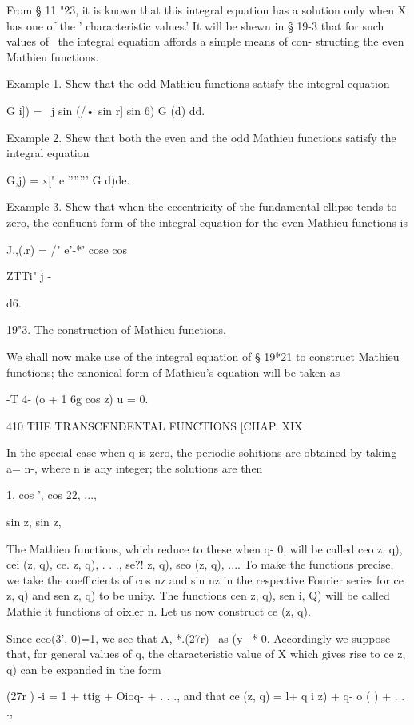 From § 11 "23, it is known that this integral equation has a solution
only when X has one of the ' characteristic values.' It will be shewn
in § 19-3 that for such values of \, the integral equation affords a
simple means of con- structing the even Mathieu functions.

Example 1. Shew that the odd Mathieu functions satisfy the integral
equation

G i]) = \ j sin (/• sin r] sin 6) G (d) dd.

Example 2. Shew that both the even and the odd Mathieu functions
satisfy the integral equation

G,j) = x[" e ''''''' G d)de.

Example 3. Shew that when the eccentricity of the fundamental ellipse
tends to zero, the confluent form of the integral equation for the
even Mathieu functions is

J,,(.r) = /" e'-*' cose cos

ZTTi" j -

d6.

19"3. The construction of Mathieu functions.

We shall now make use of the integral equation of § 19*21 to construct
Mathieu functions; the canonical form of Mathieu's equation will be
taken as

-T 4- (o + 1 6g cos z) u = 0.

410 THE TRANSCENDENTAL FUNCTIONS [CHAP. XIX

In the special case when q is zero, the periodic sohitions are
obtained by taking a= n-, where n is any integer; the solutions are
then

1, cos ', cos 22, ...,

sin z, sin z,

The Mathieu functions, which reduce to these when q- 0, will be called
ceo z, q), cei (z, q), ce. z, q), . . ., se?! z, q), seo (z, q), ....
To make the functions precise, we take the coefficients of cos nz and
sin nz in the respective Fourier series for ce z, q) and sen z, q) to
be unity. The functions cen z, q), sen i, Q) will be called Mathie it
functions of oixler n. Let us now construct ce (z, q).

Since ceo(3', 0)=1, we see that A,-*.(27r)~ as (y --* 0. Accordingly
we suppose that, for general values of q, the characteristic value of
X which gives rise to ce z, q) can be expanded in the form

(27r ) -i = 1 + ttig + Oioq- + . . ., and that ce (z, q) = l+ q i z)
+ q- o ( ) + . . .,

